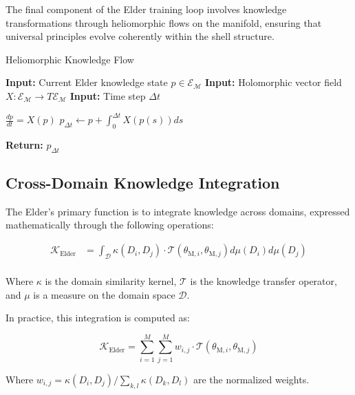The final component of the Elder training loop involves knowledge transformations through heliomorphic flows on the manifold, ensuring that universal principles evolve coherently within the shell structure.

\begin{algorithm}
\caption{Heliomorphic Knowledge Flow}
\begin{algorithmic}[1]
\State \textbf{Input:} Current Elder knowledge state $p \in \mathcal{E}_{\mathcal{M}}$
\State \textbf{Input:} Holomorphic vector field $X: \mathcal{E}_{\mathcal{M}} \rightarrow T\mathcal{E}_{\mathcal{M}}$
\State \textbf{Input:} Time step $\Delta t$

\State $\frac{dp}{dt} = X(p)$ 
\State $p_{\Delta t} \gets p + \int_0^{\Delta t} X(p(s)) ds$ 

\State \textbf{Return:} $p_{\Delta t}$
\end{algorithmic}
\end{algorithm}

\subsection{Cross-Domain Knowledge Integration}

The Elder's primary function is to integrate knowledge across domains, expressed mathematically through the following operations:

\begin{equation}
\begin{aligned}
\mathcal{K}_{\text{Elder}} &= \int_{\mathcal{D}} \kappa(D_i, D_j) \cdot \mathcal{T}(\theta_{\text{M},i}, \theta_{\text{M},j}) d\mu(D_i) d\mu(D_j) \\
\end{aligned}
\end{equation}

Where $\kappa$ is the domain similarity kernel, $\mathcal{T}$ is the knowledge transfer operator, and $\mu$ is a measure on the domain space $\mathcal{D}$.

In practice, this integration is computed as:

\begin{equation}
\mathcal{K}_{\text{Elder}} = \sum_{i=1}^M \sum_{j=1}^M w_{i,j} \cdot \mathcal{T}(\theta_{\text{M},i}, \theta_{\text{M},j})
\end{equation}

Where $w_{i,j} = \kappa(D_i, D_j) / \sum_{k,l} \kappa(D_k, D_l)$ are the normalized weights.

